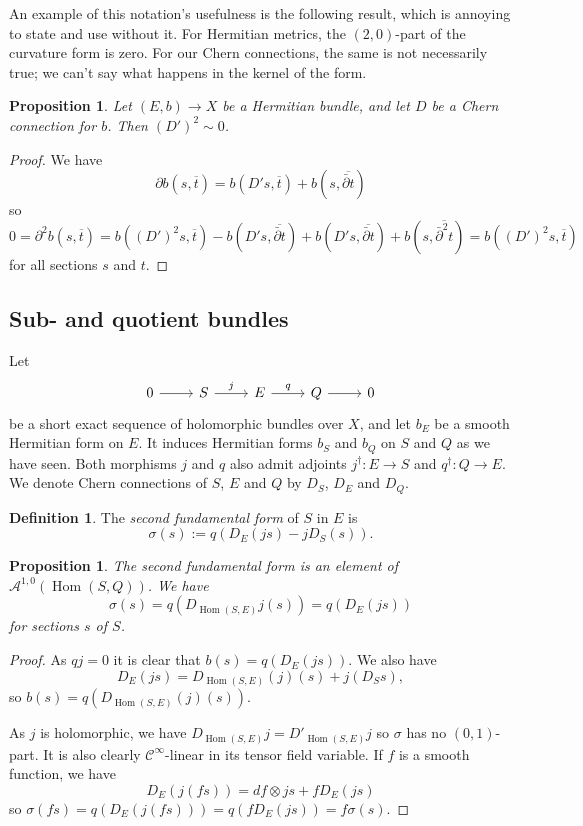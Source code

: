 \documentclass[10pt,a4paper]{amsart}
\newtheorem{prop}[theo]{Proposition}
\theoremstyle{definition}
\newtheorem{defi}[theo]{Definition}
\newcommand{\cc}[1]{\mathcal{#1}}
\def\ov#1{\overline{#1}}
\DeclareMathOperator{\Hom}{Hom}
\def\snd{\sigma}
\begin{document}
An example of this notation's usefulness is the following result, which is annoying to state and use without it. For Hermitian metrics, the $(2,0)$-part of the curvature form is zero. For our Chern connections, the same is not necessarily true; we can't say what happens in the kernel of the form.

\begin{prop}
Let $(E, b) \to X$ be a Hermitian bundle, and let $D$ be a Chern connection for $b$. Then $(D')^2 \sim 0$.
\end{prop}

\begin{proof}
We have
\[
\partial b(s, \ov t)
= b(D's, \ov t) + b(s, \ov{\bar\partial t})
\]
so
\[
0 = \partial^2 b(s, \ov t)
= b((D')^2s, \ov t)
- b(D's, \ov{\bar\partial t})
+ b(D's, \ov{\bar\partial t})
+ b(s, \ov{\bar\partial^2 t})
= b((D')^2s, \ov t)
\]
for all sections $s$ and $t$.
\end{proof}




\subsection*{Sub- and quotient bundles}

Let
\[
\begin{tikzcd}
0 \ar[r] &
S \ar[r,"j"] &
E \ar[r,"q"] &
Q \ar[r] &
0
\end{tikzcd}
\]
be a short exact sequence of holomorphic bundles over $X$, and let $b_E$ be a smooth Hermitian form on $E$. It induces Hermitian forms $b_S$ and $b_Q$ on $S$ and $Q$ as we have seen. Both morphisms $j$ and $q$ also admit adjoints $j^\dagger: E \to S$ and $q^\dagger : Q \to E$. We denote Chern connections of $S$, $E$ and $Q$ by $D_S$, $D_E$ and $D_Q$.




\begin{defi}
The \emph{second fundamental form} of $S$ in $E$ is
\[
\snd(s) := q(D_E(js) - jD_S(s)).
\]
\end{defi}

\begin{prop}
The second fundamental form is an element of $\cc A^{1,0}(\Hom(S,Q))$.
We have
\[
\snd(s)
= q(D_{\Hom(S,E)}j(s))
= q(D_E(js))
\]
for sections $s$ of $S$.
\end{prop}

\begin{proof}
As $qj = 0$ it is clear that $b(s) = q(D_E(js))$. We also have
\[
D_E(js) = D_{\Hom(S,E)}(j)(s) + j(D_Ss),
\]
so $b(s) = q(D_{\Hom(S,E)}(j)(s))$.

As $j$ is holomorphic, we have $D_{\Hom(S,E)}j = D'_{\Hom(S,E)}j$ so $\snd$ has no $(0,1)$-part. It is also clearly $\cc C^\infty$-linear in its tensor field variable. If $f$ is a smooth function, we have
\[
D_E(j(fs))
= df \otimes js + f D_E(js)
\]
so $\snd(fs) = q(D_E(j(fs))) = q(f D_E(js)) = f\snd(s)$.
\end{proof}
\end{document}
